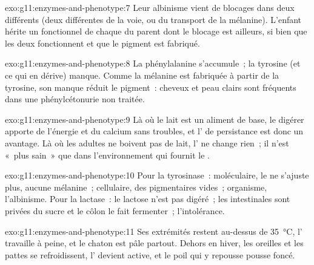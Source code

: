 \begin{solution}{exo:g11:enzymes-and-phenotype:7}
Leur albinisme vient de blocages dans deux  différents (deux
 différentes de la voie, ou du transport de la mélanine).
L'enfant hérite un  fonctionnel de chaque  du parent dont le
blocage est ailleurs, si bien que les deux  fonctionnent et que
le pigment est fabriqué.
\end{solution}

\begin{solution}{exo:g11:enzymes-and-phenotype:8}
La phénylalanine s'accumule~; la tyrosine (et ce qui en dérive)
manque. Comme la mélanine est fabriquée à partir de la tyrosine, son
manque réduit le pigment~: cheveux et peau clairs sont fréquents dans
une phénylcétonurie non traitée.
\end{solution}

\begin{solution}{exo:g11:enzymes-and-phenotype:9}
Là où le lait est un aliment de base, le digérer apporte de l'énergie
et du calcium sans troubles, et l' de persistance est donc un
avantage. Là où les adultes ne boivent pas de lait, l' ne change
rien~; il n'est «~plus sain~» que dans l'environnement qui fournit le
.
\end{solution}

\begin{solution}{exo:g11:enzymes-and-phenotype:10}
Pour la tyrosinase~: moléculaire, le  ne s'ajuste plus, aucune
mélanine~; cellulaire, des  pigmentaires vides~; organisme,
l'albinisme. Pour la lactase~: le lactose n'est pas digéré~; les
 intestinales sont privées du sucre et le côlon le fait
fermenter~; l'intolérance.
\end{solution}

\begin{solution}{exo:g11:enzymes-and-phenotype:11}
Ses extrémités restent au-dessus de \qty{35}{\celsius}, l'
travaille à peine, et le chaton est pâle partout. Dehors en hiver, les
oreilles et les pattes se refroidissent, l' devient active, et le
poil qui y repousse pousse foncé.
\end{solution}


